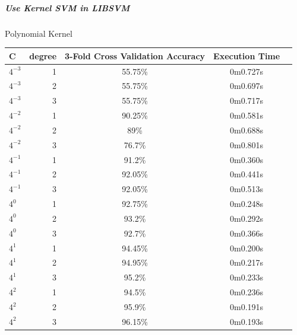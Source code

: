 \documentclass[]{report}
\begin{document}
\subparagraph{Use Kernel SVM in LIBSVM}

	\begin{center}			
		Polynomial Kernel
			\begin{tabular}{lr|c|c|c}
			\hline
			 C      &   degree & 3-Fold Cross Validation Accuracy   & Execution Time   \\
			\hline
			 $4^{-3}$ &        1 & 55.75\%                             & 0m0.727s         \\
			 $4^{-3}$ &        2 & 55.75\%                             & 0m0.697s         \\
			 $4^{-3}$ &        3 & 55.75\%                             & 0m0.717s         \\
			 $4^{-2}$ &        1 & 90.25\%                             & 0m0.581s         \\
			 $4^{-2}$ &        2 & 89\%                                & 0m0.688s         \\
			 $4^{-2}$ &        3 & 76.7\%                              & 0m0.801s         \\
			 $4^{-1}$ &        1 & 91.2\%                              & 0m0.360s         \\
			 $4^{-1}$ &        2 & 92.05\%                             & 0m0.441s         \\
			 $4^{-1}$ &        3 & 92.05\%                             & 0m0.513s         \\
			 $4^{0}$  &        1 & 92.75\%                             & 0m0.248s         \\
			 $4^{0}$  &        2 & 93.2\%                              & 0m0.292s         \\
			 $4^{0}$  &        3 & 92.7\%                              & 0m0.366s         \\
			 $4^{1}$  &        1 & 94.45\%                             & 0m0.200s         \\
			 $4^{1}$  &        2 & 94.95\%                             & 0m0.217s         \\
			 $4^{1}$  &        3 & 95.2\%                              & 0m0.233s         \\
			 $4^{2}$  &        1 & 94.5\%                              & 0m0.236s         \\
			 $4^{2}$  &        2 & 95.9\%                              & 0m0.191s         \\
			 $4^{2}$  &        3 & 96.15\%                             & 0m0.193s         \\

\end{tabular}
\end{center}
\end{document}
